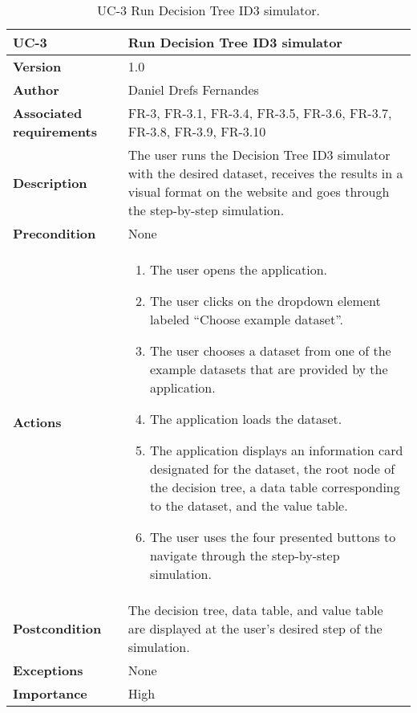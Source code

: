 \begin{table}[p]
	\centering
	\begin{tabularx}{\linewidth}{ p{} p{} }
		\toprule
		\textbf{UC-3}    & \textbf{Run Decision Tree ID3 simulator}\\
		\toprule
		\textbf{Version}              & 1.0    \\
		\textbf{Author}                & Daniel Drefs Fernandes \\
		\textbf{Associated requirements} & FR-3, FR-3.1, FR-3.4, FR-3.5, FR-3.6, FR-3.7, FR-3.8, FR-3.9, FR-3.10 \\
		\textbf{Description}          & The user runs the Decision Tree ID3 simulator with the desired dataset, receives the results in a visual format on the website and goes through the step-by-step simulation. \\
		\textbf{Precondition}         & None \\
		\textbf{Actions}             &
		\begin{enumerate}
			\def\labelenumi{\arabic{enumi}.}
			\tightlist
			\item The user opens the application.
			\item The user clicks on the dropdown element labeled ``Choose example dataset''. 
            \item The user chooses a dataset from one of the example datasets that are provided by the application.
            \item The application loads the dataset.
            \item The application displays an information card designated for the dataset, the root node of the decision tree, a data table corresponding to the dataset, and the value table.
            \item The user uses the four presented buttons to navigate through the step-by-step simulation.
		\end{enumerate}\\
		\textbf{Postcondition}        & The decision tree, data table, and value table are displayed at the user's desired step of the simulation. \\
		\textbf{Exceptions}          & None \\
		\textbf{Importance}          & High \\
		\bottomrule
	\end{tabularx}
	\caption{UC-3 Run Decision Tree ID3 simulator.}
    \label{table:uc_3}
\end{table}

